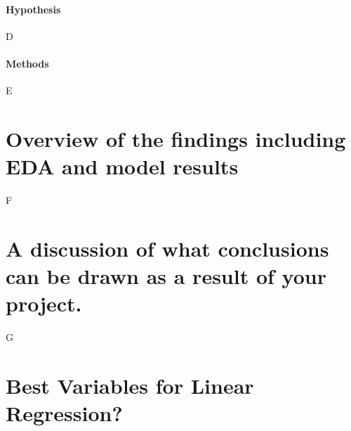 \documentclass[man]{apa6}
\begin{document}
\paragraph{Hypothesis}
D
\paragraph{Methods}
E
\section{Overview of the findings including EDA and model results}
F
\section{A discussion of what conclusions can be drawn as a result of your project.}
G
\appendix
\section{Best Variables for Linear Regression?}
\newpage
\printbibliography
\end{document}
